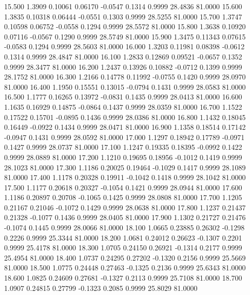   15.500   1.3909   0.10061   0.06170  -0.0547   0.1314   0.9999  28.4836  81.0000
  15.600   1.3835   0.10318   0.06444  -0.0551   0.1303   0.9999  28.5255  81.0000
  15.700   1.3747   0.10598   0.06752  -0.0558   0.1294   0.9999  28.5572  81.0000
  15.800   1.3638   0.10920   0.07116  -0.0567   0.1290   0.9999  28.5749  81.0000
  15.900   1.3475   0.11343   0.07615  -0.0583   0.1294   0.9999  28.5603  81.0000
  16.000   1.3203   0.11981   0.08398  -0.0612   0.1314   0.9999  28.4847  81.0000
  16.100   1.2833   0.12869   0.09521  -0.0657   0.1352   0.9999  28.3477  81.0000
  16.200   1.2437   0.13926   0.10882  -0.0712   0.1399   0.9999  28.1752  81.0000
  16.300   1.2166   0.14778   0.11992  -0.0755   0.1420   0.9999  28.0970  81.0000
  16.400   1.1950   0.15551   0.13015  -0.0794   0.1431   0.9999  28.0583  81.0000
  16.500   1.1777   0.16265   0.13972  -0.0831   0.1435   0.9999  28.0413  81.0000
  16.600   1.1635   0.16929   0.14875  -0.0864   0.1437   0.9999  28.0359  81.0000
  16.700   1.1522   0.17522   0.15701  -0.0895   0.1436   0.9999  28.0386  81.0000
  16.800   1.1432   0.18045   0.16449  -0.0922   0.1434   0.9999  28.0471  81.0000
  16.900   1.1358   0.18514   0.17142  -0.0947   0.1431   0.9999  28.0592  81.0000
  17.000   1.1297   0.18942   0.17789  -0.0971   0.1427   0.9999  28.0737  81.0000
  17.100   1.1247   0.19335   0.18395  -0.0992   0.1422   0.9999  28.0889  81.0000
  17.200   1.1210   0.19695   0.18956  -0.1012   0.1419   0.9999  28.1023  81.0000
  17.300   1.1186   0.20025   0.19464  -0.1029   0.1417   0.9999  28.1089  81.0000
  17.400   1.1178   0.20328   0.19911  -0.1042   0.1418   0.9999  28.1042  81.0000
  17.500   1.1177   0.20618   0.20327  -0.1054   0.1421   0.9999  28.0944  81.0000
  17.600   1.1186   0.20897   0.20708  -0.1065   0.1425   0.9999  28.0808  81.0000
  17.700   1.1205   0.21167   0.21046  -0.1072   0.1429   0.9999  28.0638  81.0000
  17.800   1.1237   0.21437   0.21328  -0.1077   0.1436   0.9999  28.0405  81.0000
  17.900   1.1302   0.21727   0.21476  -0.1074   0.1445   0.9999  28.0066  81.0000
  18.100   1.0665   0.23885   0.26302  -0.1298   0.2226   0.9999  25.3344  81.0000
  18.200   1.0681   0.24012   0.26623  -0.1307   0.2201   0.9999  25.4178  81.0000
  18.300   1.0705   0.24150   0.26921  -0.1314   0.2177   0.9999  25.4954  81.0000
  18.400   1.0737   0.24295   0.27202  -0.1320   0.2156   0.9999  25.5669  81.0000
  18.500   1.0775   0.24448   0.27463  -0.1325   0.2136   0.9999  25.6343  81.0000
  18.600   1.0825   0.24609   0.27681  -0.1327   0.2113   0.9999  25.7108  81.0000
  18.700   1.0907   0.24815   0.27799  -0.1323   0.2085   0.9999  25.8029  81.0000
